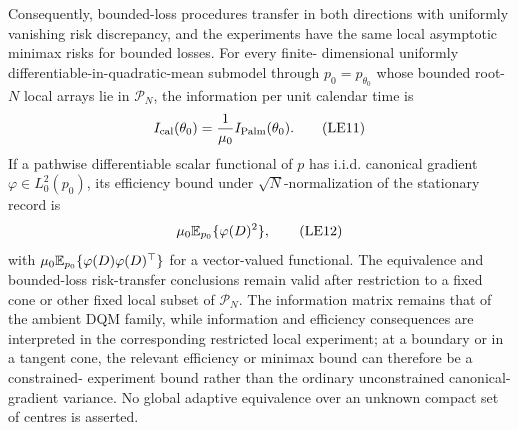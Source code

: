 \begin{theorem}
Consequently, bounded-loss procedures transfer in both directions with
uniformly vanishing risk discrepancy, and the experiments have the same
local asymptotic minimax risks for bounded losses.  For every finite-
dimensional uniformly differentiable-in-quadratic-mean submodel through
\(p_0=p_{\theta_0}\) whose bounded root-\(N\) local arrays lie in
\(\mathcal P_N\), the information per unit calendar time is
\[
 I_{\rm cal}(\theta_0)
 =\frac1{\mu_0}I_{\rm Palm}(\theta_0).
\tag{LE11}
\]
If a pathwise differentiable scalar functional of \(p\) has i.i.d.
canonical gradient \(\varphi\in L_0^2(p_0)\), its efficiency bound under
\(\sqrt N\)-normalization of the stationary record is
\[
 \mu_0\mathbb{E}_{p_0}\{\varphi(D)^2\},
\tag{LE12}
\]
with \(\mu_0\mathbb{E}_{p_0}\{\varphi(D)\varphi(D)^\top\}\) for a vector-valued
functional.  The equivalence and bounded-loss risk-transfer conclusions remain
valid after restriction to a fixed cone or other fixed local subset of
\(\mathcal P_N\).  The information matrix remains that of the ambient DQM
family, while information and efficiency consequences are interpreted in the
corresponding restricted local experiment; at a boundary or in a tangent cone,
the relevant efficiency or minimax bound can therefore be a constrained-
experiment bound rather than the ordinary unconstrained canonical-gradient
variance.  No global adaptive equivalence over an unknown compact set of
centres is asserted.
\end{theorem}

